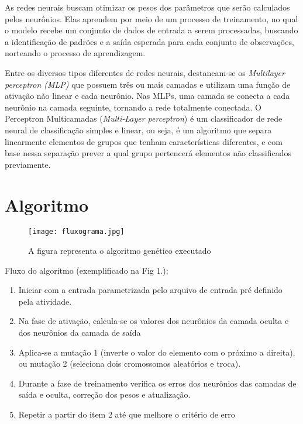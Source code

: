 \documentclass[runningheads]{llncs}
\begin{document}
As redes neurais buscam otimizar os pesos dos parâmetros que serão calculados pelos neurônios. Elas aprendem por meio de um processo de treinamento, no qual o modelo recebe um conjunto de dados de entrada a serem processadas, buscando a identificação de padrões e a saída esperada para cada conjunto de observações, norteando o processo de aprendizagem. \cite{M}

Entre os diversos tipos diferentes de redes neurais, destancam-se os \textit{Multilayer perceptron (MLP)} que possuem três ou mais camadas e utilizam uma função de ativação não linear e cada neurônio. Nas MLPs, uma camada se conecta a cada neurônio na camada seguinte, tornando a rede totalmente conectada.  \cite{M} 
O Perceptron Multicamadas (\textit{Multi-Layer perceptron}) é um classificador de rede neural de classificação simples e linear, ou seja, é um algoritmo que separa linearmente elementos de grupos que tenham características diferentes, e com base nessa separação prever a qual grupo pertencerá elementos não classificados previamente.




\section{Algoritmo}

\begin{figure}
\begin{center}
\texttt{[image: fluxograma.jpg]}
\end{center}
\caption{A figura representa o algoritmo genético executado} \label{fig1}
\end{figure}

Fluxo do algoritmo (exemplificado na Fig 1.):
\begin{enumerate}
	\item Iniciar com a entrada parametrizada pelo arquivo de entrada pré definido pela atividade.
	\item Na fase de ativação, calcula-se os valores dos neurônios da camada oculta e dos neurônios da camada de saída
	\item Aplica-se a mutação 1 (inverte o valor do elemento com o próximo a direita), ou mutação 2 (seleciona dois cromossomos aleatórios e troca).
	\item Durante a fase de treinamento verifica os erros dos neurônios das camadas de saída e oculta, correção dos pesos e atualização.
	\item Repetir a partir do item 2 até que melhore o critério de erro
\end{enumerate}
\end{document}
